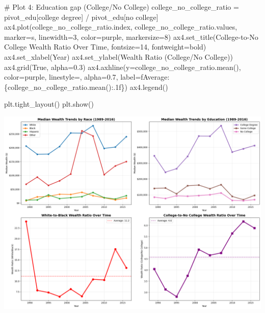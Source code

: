 \documentclass[
  letterpaper,
  DIV=11,
  numbers=noendperiod]{scrartcl}
\newenvironment{Shaded}{\begin{snugshade}}{\end{snugshade}}
\newcommand{\CommentTok}[1]{\textcolor[rgb]{0.37,0.37,0.37}{#1}}
\newcommand{\DecValTok}[1]{\textcolor[rgb]{0.68,0.00,0.00}{#1}}
\newcommand{\FloatTok}[1]{\textcolor[rgb]{0.68,0.00,0.00}{#1}}
\newcommand{\NormalTok}[1]{\textcolor[rgb]{0.00,0.23,0.31}{#1}}
\newcommand{\OperatorTok}[1]{\textcolor[rgb]{0.37,0.37,0.37}{#1}}
\newcommand{\SpecialCharTok}[1]{\textcolor[rgb]{0.37,0.37,0.37}{#1}}
\newcommand{\SpecialStringTok}[1]{\textcolor[rgb]{0.13,0.47,0.30}{#1}}
\newcommand{\StringTok}[1]{\textcolor[rgb]{0.13,0.47,0.30}{#1}}
\newcommand{\VariableTok}[1]{\textcolor[rgb]{0.07,0.07,0.07}{#1}}
\begin{document}
\begin{Shaded}
\begin{Highlighting}[]
\CommentTok{\# Plot 4: Education gap (College/No College)}
\NormalTok{college\_no\_college\_ratio }\OperatorTok{=}\NormalTok{ pivot\_edu[}\StringTok{\textquotesingle{}college degree\textquotesingle{}}\NormalTok{] }\OperatorTok{/}\NormalTok{ pivot\_edu[}\StringTok{\textquotesingle{}no college\textquotesingle{}}\NormalTok{]}
\NormalTok{ax4.plot(college\_no\_college\_ratio.index, college\_no\_college\_ratio.values, marker}\OperatorTok{=}\StringTok{\textquotesingle{}s\textquotesingle{}}\NormalTok{, }
\NormalTok{         linewidth}\OperatorTok{=}\DecValTok{3}\NormalTok{, color}\OperatorTok{=}\StringTok{\textquotesingle{}purple\textquotesingle{}}\NormalTok{, markersize}\OperatorTok{=}\DecValTok{8}\NormalTok{)}
\NormalTok{ax4.set\_title(}\StringTok{\textquotesingle{}College{-}to{-}No College Wealth Ratio Over Time\textquotesingle{}}\NormalTok{, fontsize}\OperatorTok{=}\DecValTok{14}\NormalTok{, fontweight}\OperatorTok{=}\StringTok{\textquotesingle{}bold\textquotesingle{}}\NormalTok{)}
\NormalTok{ax4.set\_xlabel(}\StringTok{\textquotesingle{}Year\textquotesingle{}}\NormalTok{)}
\NormalTok{ax4.set\_ylabel(}\StringTok{\textquotesingle{}Wealth Ratio (College/No College)\textquotesingle{}}\NormalTok{)}
\NormalTok{ax4.grid(}\VariableTok{True}\NormalTok{, alpha}\OperatorTok{=}\FloatTok{0.3}\NormalTok{)}
\NormalTok{ax4.axhline(y}\OperatorTok{=}\NormalTok{college\_no\_college\_ratio.mean(), color}\OperatorTok{=}\StringTok{\textquotesingle{}purple\textquotesingle{}}\NormalTok{, linestyle}\OperatorTok{=}\StringTok{\textquotesingle{}{-}{-}\textquotesingle{}}\NormalTok{, alpha}\OperatorTok{=}\FloatTok{0.7}\NormalTok{,}
\NormalTok{           label}\OperatorTok{=}\SpecialStringTok{f\textquotesingle{}Average: }\SpecialCharTok{\{}\NormalTok{college\_no\_college\_ratio}\SpecialCharTok{.}\NormalTok{mean()}\SpecialCharTok{:.1f\}}\SpecialStringTok{\textquotesingle{}}\NormalTok{)}
\NormalTok{ax4.legend()}

\NormalTok{plt.tight\_layout()}
\NormalTok{plt.show()}
\end{Highlighting}
\end{Shaded}

\includegraphics{main_files/figure-pdf/cell-10-output-1.png}
\end{document}
